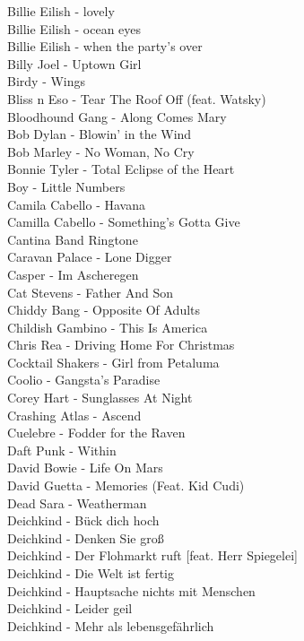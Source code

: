 Billie Eilish - lovely\\
Billie Eilish - ocean eyes\\
Billie Eilish - when the party's over\\
Billy Joel - Uptown Girl\\
Birdy - Wings\\
Bliss n Eso - Tear The Roof Off (feat. Watsky)\\
Bloodhound Gang - Along Comes Mary\\
Bob Dylan - Blowin' in the Wind\\
Bob Marley - No Woman, No Cry\\
Bonnie Tyler - Total Eclipse of the Heart\\
Boy - Little Numbers\\
Camila Cabello - Havana\\
Camilla Cabello - Something's Gotta Give\\
Cantina Band Ringtone\\
Caravan Palace - Lone Digger\\
Casper - Im Ascheregen\\
Cat Stevens - Father And Son\\
Chiddy Bang - Opposite Of Adults\\
Childish Gambino - This Is America\\
Chris Rea - Driving Home For Christmas\\
Cocktail Shakers - Girl from Petaluma\\
Coolio - Gangsta's Paradise\\
Corey Hart - Sunglasses At Night\\
Crashing Atlas - Ascend\\
Cuelebre - Fodder for the Raven\\
Daft Punk - Within\\
David Bowie - Life On Mars\\
David Guetta - Memories (Feat. Kid Cudi)\\
Dead Sara - Weatherman\\
Deichkind - Bück dich hoch\\
Deichkind - Denken Sie groß\\
Deichkind - Der Flohmarkt ruft [feat. Herr Spiegelei]\\
Deichkind - Die Welt ist fertig\\
Deichkind - Hauptsache nichts mit Menschen\\
Deichkind - Leider geil\\
Deichkind - Mehr als lebensgefährlich\\
